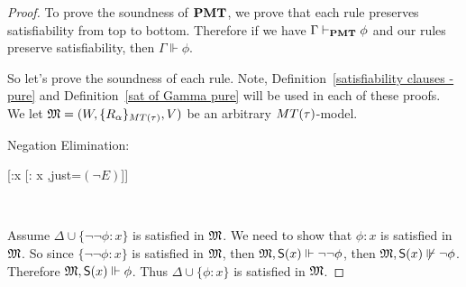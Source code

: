\begin{proof}
    \par To prove the soundness of $\textbf{PMT}$, we prove that each rule preserves satisfiability from top to bottom. Therefore if we have $\Gamma \vdash_{\textbf{PMT}} \phi$ and our rules preserve satisfiability, then $\Gamma\Vdash \phi$.

\par So let's prove the soundness of each rule. Note, Definition~\ref{satisfiability clauses - pure} and Definition~\ref{sat of Gamma pure} will be used in each of these proofs. We let $\mathfrak{M} = (W,\{ R_{\alpha} \}_{MT(\tau)},V)$ be an arbitrary $MT(\tau)$-model.


\begin{center}
\renewcommand*\linenumberstyle[1]{}

Negation Elimination: \\
\begin{tableau}
    {}
    [\Delta \coms \neg\neg\phi :x
    [\Delta \coms \phi: x ,just={$(\neg E)$}]]
\end{tableau}
\end{center}\

\par Assume $\Delta \cup \{\neg\neg\phi:x\}$ is satisfied in $\mathfrak{M}$. We need to show that $\phi:x$ is satisfied in $\mathfrak{M}$. So since $\{\neg\neg\phi:x\}$ is satisfied in $\mathfrak{M}$, then $\mathfrak{M},\mathsf{S}(x) \Vdash \neg\neg\phi$, then $\mathfrak{M},\mathsf{S}(x) \not\Vdash \neg\phi$. Therefore $\mathfrak{M},\mathsf{S}(x) \Vdash \phi$. Thus $\Delta \cup \{\phi:x\}$ is satisfied in $\mathfrak{M}$.


\end{proof}

